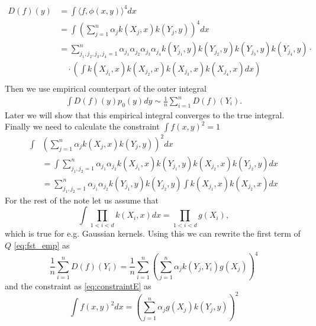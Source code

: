 \documentclass[10pt]{article}
\begin{document}
\begin{align}
D(f)(y) &=  \int \langle f,\phi(x,y) \rangle^4 dx \\
&=\int \left( \sum_{j=1}^{n} \alpha_j k(X_j,x) k(Y_j,y) \right)^4 dx \\
&=  \sum_{j_1,j_2,j_3,j_4=1}^n  \alpha_{j_1} \alpha_{j_2} \alpha_{j_3} \alpha_{j_4}  k(Y_{j_1},y) k(Y_{j_2},y)k(Y_{j_3},y)k(Y_{j_4},y) \cdot\\
  &\quad \cdot   \left( \int k(X_{j_1},x) k(X_{j_2},x) k(X_{j_3},x) k(X_{j_4},x)  dx \right) \\
\end{align}
Then we use empirical counterpart of the outer integral 
\begin{align}
\label{eq:fst_emp}
 \int D(f)(y) p_0(y) dy \sim  \frac 1 n \sum_{i=1}^{n} D(f)(Y_i).
\end{align}
Later we will show  that this empirical integral converges to the true integral. Finally we need to calculate the constraint $\int f(x,y)^2=1$ 
\begin{align}
\label{eq:constraint}
 \int& \left( \sum_{j=1}^{n} \alpha_j  k(X_{j},x)  k(Y_{j},y) \right )^2 dx \\ 
 &= \int  \sum_{j_1,j_2=1}^{n} \alpha_{j_1} \alpha_{j_2}  k(X_{j_1},x)  k(Y_{j_1},y) k(X_{j_2},x)  k(Y_{j_2},y)  dx\\
 &=   \sum_{j_1,j_2=1}^{n} \alpha_{j_1} \alpha_{j_2}  k(Y_{j_1},y)  k(Y_{j_2},y) \int  k(X_{j_1},x)  k(X_{j_2},x)    dx  \label{eq:constraintE}
\end{align}
For the rest of the note let us assume that  
$$
\int \prod_{1<i<d} k(X_i,x) dx   = \prod_{1<i<d}  g(X_i), 
$$
which is true for e.g. Gaussian kernels. Using this we can rewrite the first term of $Q$ \eqref{eq:fst_emp} as
\begin{equation}
 \frac 1 n \sum_{i=1}^{n} D(f)(Y_i) =  \frac 1 n \sum_{i=1}^{n} \left( \sum_{j=1}^{n} \alpha_j k(Y_j,Y_i) g(X_j) \right)^4
\end{equation}
and the constraint as \eqref{eq:constraintE} as
\begin{equation}
\label{eq:const2}
\int f(x,y)^2 dx=  \left( \sum_{j=1}^{n} \alpha_j  g(X_{j})  k(Y_{j},y) \right )^2 
\end{equation}
\end{document}
